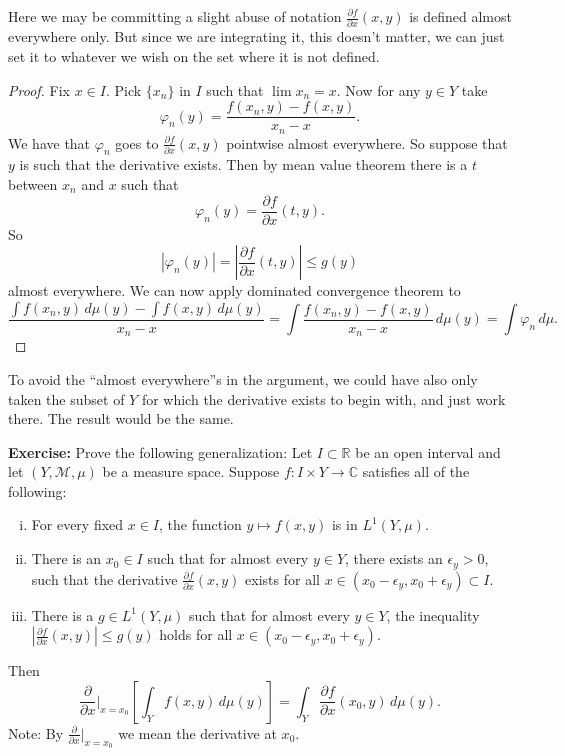 \documentclass[12pt]{book}
\newcommand{\abs}[1]{\left\lvert {#1} \right\rvert}
\newcommand{\C}{{\mathbb{C}}}
\newcommand{\R}{{\mathbb{R}}}
\newcommand{\sM}{{\mathcal{M}}}
\theoremstyle{plain}
\theoremstyle{remark}
\theoremstyle{definition}
\theoremstyle{exercise}
\theoremstyle{example}
\begin{document}
\medskip

Here we may be committing a slight abuse of notation
$\frac{\partial f}{\partial x}(x,y)$ is defined almost everywhere only.  But
since we are integrating it, this doesn't matter, we can just set it
to whatever we wish on the set where it is not defined.

\medskip

\begin{proof}
Fix $x \in I$.  Pick $\{ x_n \}$ in $I$ such that $\lim x_n = x$.
Now for any $y \in Y$ take
$$
\varphi_n(y) = \frac{f(x_n,y)-f(x,y)}{x_n-x} .
$$
We have that $\varphi_n$ goes to
$\frac{\partial f}{\partial x}(x,y)$ pointwise almost everywhere.
So suppose that $y$ is such that the derivative exists.  Then
by mean value theorem there is a $t$ between $x_n$ and $x$ such that
$$
\varphi_n(y) = \frac{\partial f}{\partial x}(t,y) .
$$
So
$$
\abs{\varphi_n(y)} = \abs{\frac{\partial f}{\partial x}(t,y)} \leq g(y)
$$
almost everywhere.
We can now apply dominated convergence theorem to
$$
\frac{\int f(x_n,y) \, d\mu(y) -\int f(x,y) \, d\mu(y) }{x_n-x} =
\int \frac{f(x_n,y)  - f(x,y)}{x_n-x} \, d\mu(y) =
\int \varphi_n \, d\mu .
$$
\end{proof}

To avoid the ``almost everywhere''s in the argument, we could have also only taken the subset of
$Y$ for which the derivative exists to begin with, and just work there.  The
result would be the same.



\medskip

\textbf{Exercise:}
Prove the following generalization:
Let $I \subset \R$ be an open interval and let $(Y,\sM,\mu)$ be a measure
space.
Suppose $f\colon I \times Y \to \C$ satisfies all of the following:
\begin{enumerate}[(i)]
\item
For every fixed $x \in I$, the function
$y \mapsto f(x,y)$ is in $L^1(Y,\mu)$.
\item
There is an $x_0 \in I$ such that
for almost every
$y \in Y$, there exists an $\epsilon_y > 0$, such that the derivative
$\frac{\partial f}{\partial x}(x,y)$ exists for all $x \in
(x_0-\epsilon_y,x_0+\epsilon_y) \subset I$.
\item
There is a $g \in L^1(Y,\mu)$ such that
for almost every $y \in Y$, the inequality
$\abs{\frac{\partial f}{\partial x}(x,y)} \leq g(y)$
holds for all $x \in (x_0-\epsilon_y,x_0+\epsilon_y)$.
\end{enumerate}
Then
$$
\frac{\partial}{\partial x} \Bigr|_{x=x_0} \left[\int_Y f(x,y) \, d\mu(y) \right] =
\int_Y \frac{\partial f}{\partial x}(x_0,y) \, d\mu(y) .
$$
Note: By
$\frac{\partial}{\partial x} \bigr|_{x=x_0}$ we mean the derivative at $x_0$.
\end{document}
